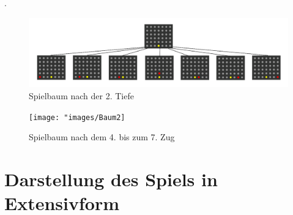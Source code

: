 .
\begin{figure}[H]
	\centering
	\includegraphics[width=0.7\linewidth]{"images/Bildschirmfoto 2025-01-07 um 12.01.00"}
	\caption{Spielbaum nach der 2. Tiefe}
	\label{fig:bildschirmfoto-2025-01-07-um-12}
\end{figure}

\begin{figure}[H]
	\centering
	\texttt{[image: "images/Baum2]}
	\caption[Spielbaum nach dem 4. Zug. Quelle: \cite{vandewiele2017}]{Spielbaum nach dem 4. bis zum 7. Zug}
	\label{fig:Baum2}
\end{figure}



 \section{Darstellung des Spiels in Extensivform}
%
%

